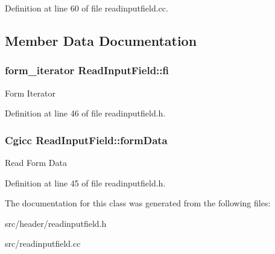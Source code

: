 Definition at line 60 of file readinputfield.\-cc.



\subsection{Member Data Documentation}
\hypertarget{classReadInputField_ae252dc321be04c2c1afa6928ad16a45d}{
\subsubsection[{fi}]{\setlength{\rightskip}{0pt plus 5cm}form\-\_\-iterator Read\-Input\-Field\-::fi\hspace{0.3cm}{\ttfamily [protected]}}}\label{classReadInputField_ae252dc321be04c2c1afa6928ad16a45d}
Form Iterator 

Definition at line 46 of file readinputfield.\-h.

\hypertarget{classReadInputField_a1e4ebac8979fd9b2771320d669fce5fc}{
\subsubsection[{form\-Data}]{\setlength{\rightskip}{0pt plus 5cm}Cgicc Read\-Input\-Field\-::form\-Data\hspace{0.3cm}{\ttfamily [protected]}}}\label{classReadInputField_a1e4ebac8979fd9b2771320d669fce5fc}
Read Form Data 

Definition at line 45 of file readinputfield.\-h.



The documentation for this class was generated from the following files\-:\begin{DoxyCompactItemize}
\item 
src/header/readinputfield.\-h\item 
src/readinputfield.\-cc\end{DoxyCompactItemize}
